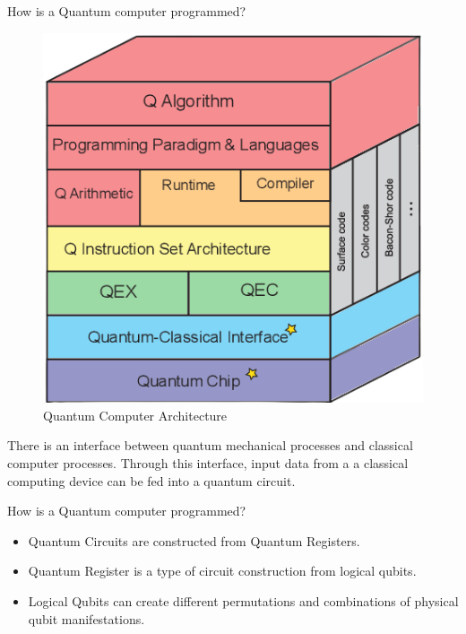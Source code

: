 \begin{frame}{How is a Quantum computer programmed?}
\begin{figure}[H]
    \centering
    \includegraphics[width=.4\linewidth]{ Hto8a.png}
    \caption{Quantum Computer Architecture}
\end{figure}
There is an \alert{interface} between quantum mechanical processes and classical computer processes. Through this interface, input data from a a classical computing device can be fed into a quantum circuit.
\end{frame}

\begin{frame}{How is a Quantum computer programmed?}
    \begin{itemize}
        \item \alert{Quantum Circuits} are constructed from Quantum Registers.
        \item \alert{Quantum Register} is a type of circuit construction from logical qubits. 
        \item \alert{Logical Qubits} can create different permutations and combinations of physical qubit manifestations.
    \end{itemize}
\end{frame}

